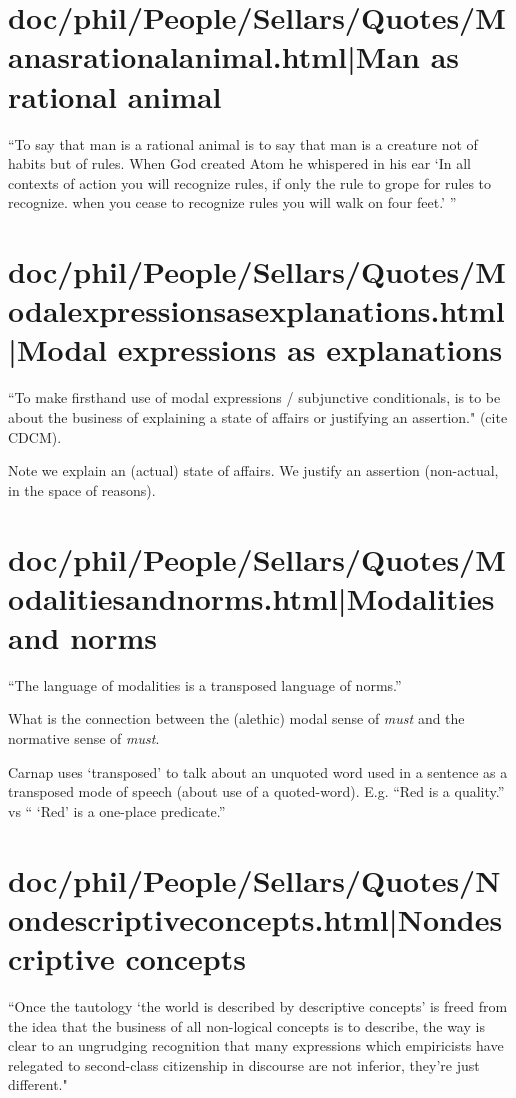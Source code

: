 \documentclass[12pt,a4paper]{report}
\begin{document}
\section{doc/phil/People/Sellars/Quotes/Manasrationalanimal.html|Man as rational animal}
``To say that man is a rational animal is to say that man is a creature not of
habits but of rules. When God created Atom he whispered in his ear `In all
contexts of action you will recognize rules, if only the rule to grope for rules
to recognize. when you cease to recognize rules you will walk on four feet.' ''

\section{doc/phil/People/Sellars/Quotes/Modalexpressionsasexplanations.html|Modal expressions as explanations}
``To make firsthand use of modal expressions / subjunctive conditionals, is to
be about the business of explaining a state of affairs or justifying an
assertion." (cite CDCM).

Note we explain an (actual) state of affairs. We justify an assertion
(non-actual, in the space of reasons).

\section{doc/phil/People/Sellars/Quotes/Modalitiesandnorms.html|Modalities and norms}
``The language of modalities is a transposed language of norms.''


What is the connection between the (alethic) modal sense of \emph{must} and the
 normative sense of \emph{must}.

Carnap uses `transposed' to talk about an unquoted word used in a sentence as a
transposed mode of speech (about use of a quoted-word). E.g. ``Red is a
quality.'' vs `` `Red' is a one-place predicate.''

\section{doc/phil/People/Sellars/Quotes/Nondescriptiveconcepts.html|Nondescriptive concepts}
``Once the tautology `the world is described by descriptive concepts' is freed
from the idea that the business of all non-logical concepts is to describe, the
 way is clear to an ungrudging recognition that many expressions which
 empiricists have relegated to second-class citizenship in discourse are not
 inferior, they're just different."
\end{document}
